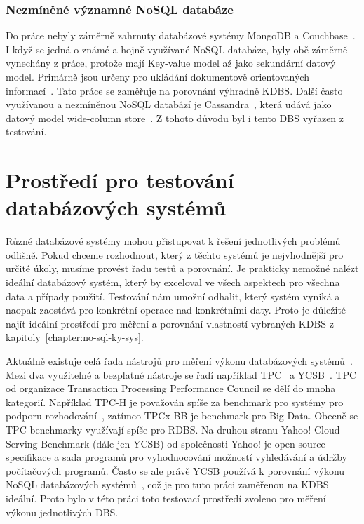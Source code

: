 \documentclass[czech,master,dept460,male,csharp,cpdeclaration]{diploma}
\begin{document}
	\subsection {Nezmíněné významné NoSQL databáze}
	
		Do práce nebyly záměrně zahrnuty databázové systémy MongoDB a Couchbase~\cite{mongodb,couchbase}. I když se jedná o známé a hojně využívané NoSQL databáze, byly obě záměrně vynechány z práce, protože mají Key-value model až jako sekundární datový model. Primárně jsou určeny pro ukládání dokumentově orientovaných informací~\cite{documentdb}. Tato práce se zaměřuje na porovnání výhradně KDBS. Další často využívanou a nezmíněnou NoSQL databází je Cassandra~\cite{cassandra}, která udává jako datový model wide-column store~\cite{widecolumnstore}. Z tohoto důvodu byl i tento DBS vyřazen z testování.
	
	\chapter{Prostředí pro testování databázových systémů\label{chapter:3-test_environment}}
	
	Různé databázové systémy mohou přistupovat k řešení jednotlivých problémů odlišně. Pokud chceme rozhodnout, který z těchto systémů je nejvhodnější pro určité úkoly, musíme provést řadu testů a porovnání. Je prakticky nemožné nalézt ideální databázový systém, který by exceloval ve všech aspektech pro všechna data a případy použití. Testování nám umožní odhalit, který systém vyniká a naopak zaostává pro konkrétní operace nad konkrétními daty. Proto je důležité najít ideální prostředí pro měření a porovnání vlastností vybraných KDBS z kapitoly~\ref{chapter:no-sql-ky-sys}.
	
	Aktuálně existuje celá řada nástrojů pro měření výkonu databázových systémů~\cite{dbs-testing-tools}. Mezi dva využitelné a bezplatné nástroje se řadí například TPC~\cite{tpc} a YCSB~\cite{ycsb}. TPC od organizace Transaction Processing Performance Council se dělí do mnoha kategorií. Například TPC-H je považován spíše za benchmark pro systémy pro podporu rozhodování~\cite{dss}, zatímco TPCx-BB je benchmark pro Big Data. Obecně se TPC benchmarky využívají spíše pro RDBS. Na druhou stranu Yahoo! Cloud Serving Benchmark (dále jen YCSB) od společnosti Yahoo! je open-source specifikace a sada programů pro vyhodnocování možností vyhledávání a údržby počítačových programů. Často se ale právě YCSB používá k porovnání výkonu NoSQL databázových systémů~\cite{benchmark-pdf-1, benchmark-pdf-2}, což je pro tuto práci zaměřenou na KDBS ideální. Proto bylo v této práci toto testovací prostředí zvoleno pro měření výkonu jednotlivých DBS.
	
\end{document}
